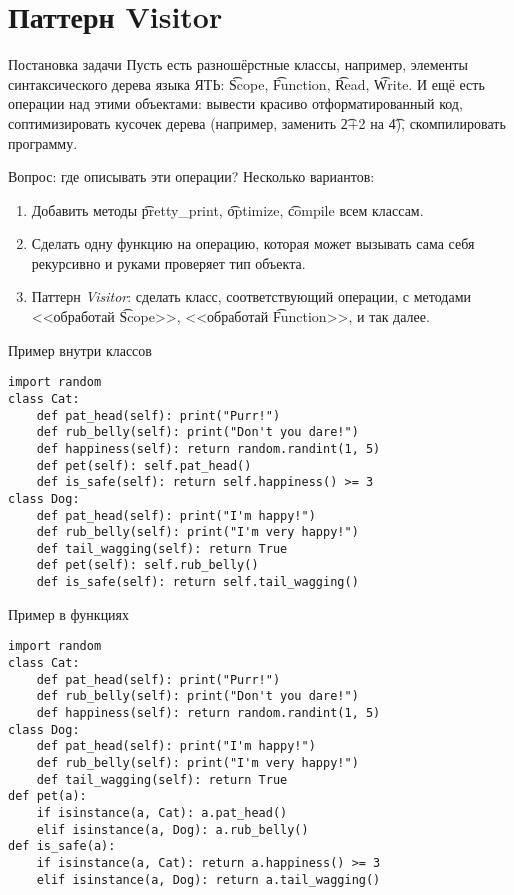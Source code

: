 \section{Паттерн Visitor}

\begin{frame}
	\tableofcontents[currentsection]
\end{frame}

\begin{frame}{Постановка задачи}
	Пусть есть разношёрстные классы, например, элементы синтаксического дерева языка ЯТЬ:
	\t{Scope}, \t{Function}, \t{Read}, \t{Write}.
	И ещё есть операции над этими объектами: вывести красиво отформатированный код,
	соптимизировать кусочек дерева (например, заменить \t{2+2} на \t{4}),
	скомпилировать программу.

	Вопрос: где описывать эти операции?
	\pause
	Несколько вариантов:
	\begin{enumerate}
		\item
			Добавить методы \t{pretty\_print}, \t{optimize}, \t{compile} всем классам.
		\item
			Сделать одну функцию на операцию, которая может вызывать сама себя рекурсивно
			и руками проверяет тип объекта.
		\item
			Паттерн \textit{Visitor}: сделать класс, соответствующий операции, с методами
			<<обработай \t{Scope}>>, <<обработай \t{Function}>>, и так далее.
	\end{enumerate}
\end{frame}

\begin{frame}[fragile]{Пример внутри классов}
\begin{verbatim}
import random
class Cat:
    def pat_head(self): print("Purr!")
    def rub_belly(self): print("Don't you dare!")
    def happiness(self): return random.randint(1, 5)
    def pet(self): self.pat_head()
    def is_safe(self): return self.happiness() >= 3
class Dog:
    def pat_head(self): print("I'm happy!")
    def rub_belly(self): print("I'm very happy!")
    def tail_wagging(self): return True
    def pet(self): self.rub_belly()
    def is_safe(self): return self.tail_wagging()
\end{verbatim}
\end{frame}

\begin{frame}[fragile]{Пример в функциях}
\begin{verbatim}
import random
class Cat:
    def pat_head(self): print("Purr!")
    def rub_belly(self): print("Don't you dare!")
    def happiness(self): return random.randint(1, 5)
class Dog:
    def pat_head(self): print("I'm happy!")
    def rub_belly(self): print("I'm very happy!")
    def tail_wagging(self): return True
def pet(a):
    if isinstance(a, Cat): a.pat_head()
    elif isinstance(a, Dog): a.rub_belly()
def is_safe(a):
    if isinstance(a, Cat): return a.happiness() >= 3
    elif isinstance(a, Dog): return a.tail_wagging()
\end{verbatim}
\end{frame}

